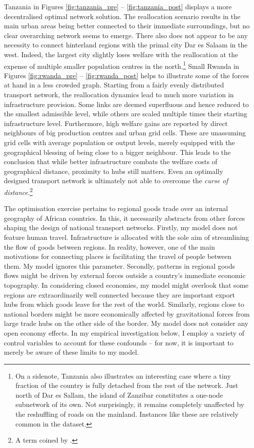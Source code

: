 \documentclass[11pt, oneside]{article}   	%
\begin{document}
Tanzania in Figures \eqref{fig:tanzania_pre} -- \eqref{fig:tanzania_post} displays a more decentralised optimal network solution. The reallocation scenario results in the main urban areas being better connected to their immediate surroundings, but no clear overarching network seems to emerge. There also does not appear to be any necessity to connect hinterland regions with the primal city Dar es Salaam in the west. Indeed, the largest city slightly loses welfare with the reallocation at the expense of multiple smaller population centres in the north.\footnote{On a sidenote, Tanzania also illustrates an interesting case where a tiny fraction of the country is fully detached from the rest of the network. Just north of Dar es Sallam, the island of Zanzibar constitutes a one-node subnetwork of its own. Not surprisingly, it remains completely unaffected by the reshuffling of roads on the mainland. Instances like these are relatively common in the dataset.} Small Rwanda in Figures \eqref{fig:rwanda_pre} -- \eqref{fig:rwanda_post} helps to illustrate some of the forces at hand in a less crowded graph. Starting from a fairly evenly distributed transport network, the reallocation dynamics lead to much more variation in infrastructure provision. Some links are deemed superfluous and hence reduced to the smallest admissible level, while others are scaled multiple times their starting infrastructure level. Furthermore, high welfare gains are reported by direct neighbours of big production centres and urban grid cells. These are unassuming grid cells with average population or output levels, merely equipped with the geographical blessing of being close to a bigger neighbour. This leads to the conclusion that while better infrastructure combats the welfare costs of geographical distance, proximity to hubs still matters. Even an optimally designed transport network is ultimately not able to overcome the \emph{curse of distance}.\footnote{A term coined by \cite{Boulhol_Havedevelopedcountries_2010}.}

The optimisation exercise pertains to regional goods trade over an internal geography of African countries. In this, it necessarily abstracts from other forces shaping the design of national transport networks. Firstly, my model does not feature human travel. Infrastructure is allocated with the sole aim of streamlining the flow of goods between regions. In reality, however, one of the main motivations for connecting places is facilitating the travel of people between them. My model ignores this parameter. Secondly, patterns in regional goods flows might be driven by external forces outside a country's immediate economic topography. In considering closed economies, my model might overlook that some regions are extraordinarily well connected because they are important export hubs from which goods leave for the rest of the world. Similarly, regions close to national borders might be more economically affected by gravitational forces from large trade hubs on the other side of the border. My model does not consider any open economy effects. In my empirical investigation below, I employ a variety of control variables to account for these confounds -- for now, it is important to merely be aware of these limits to my model.
\end{document}
